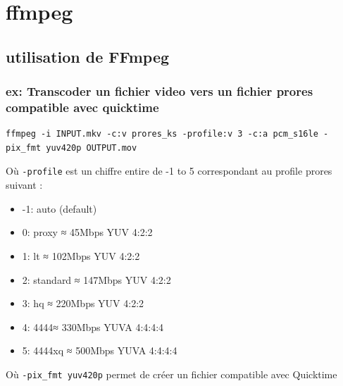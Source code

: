 \documentclass[
]{book}
\providecommand{\tightlist}{%
  \setlength{\itemsep}{0pt}\setlength{\parskip}{0pt}}
\begin{document}
\hypertarget{ffmpeg}{%
\chapter{ffmpeg}\label{ffmpeg}}

\hypertarget{utilisation-de-ffmpeg}{%
\section{utilisation de FFmpeg}\label{utilisation-de-ffmpeg}}

\hypertarget{ex-transcoder-un-fichier-video-vers-un-fichier-prores-compatible-avec-quicktime}{%
\subsection{ex: Transcoder un fichier video vers un fichier prores compatible avec quicktime}\label{ex-transcoder-un-fichier-video-vers-un-fichier-prores-compatible-avec-quicktime}}

\begin{verbatim}
ffmpeg -i INPUT.mkv -c:v prores_ks -profile:v 3 -c:a pcm_s16le -pix_fmt yuv420p OUTPUT.mov
\end{verbatim}

Où \texttt{-profile} est un chiffre entire de -1 to 5 correspondant au profile prores suivant :

\begin{itemize}
\tightlist
\item
  -1: auto (default)
\item
  0: proxy ≈ 45Mbps YUV 4:2:2
\item
  1: lt ≈ 102Mbps YUV 4:2:2
\item
  2: standard ≈ 147Mbps YUV 4:2:2
\item
  3: hq ≈ 220Mbps YUV 4:2:2
\item
  4: 4444≈ 330Mbps YUVA 4:4:4:4
\item
  5: 4444xq ≈ 500Mbps YUVA 4:4:4:4
\end{itemize}

Où \texttt{-pix\_fmt\ yuv420p} permet de créer un fichier compatible avec Quicktime

  
\end{document}
